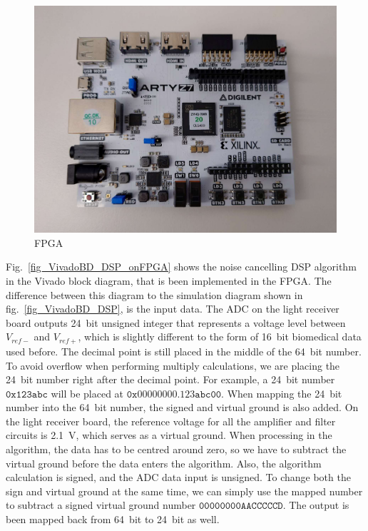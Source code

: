 \begin{figure}[h]
\centering
\includegraphics[width=1\linewidth]{4-ANC_Sys/FPGA.jpg}
\caption{FPGA}
\label{fig_FPGA}
\end{figure}

Fig.~\ref{fig_VivadoBD_DSP_onFPGA} shows the noise cancelling DSP algorithm in the Vivado block diagram, that is been implemented in the FPGA.  The difference between this diagram to the simulation diagram shown in fig.~\ref{fig_VivadoBD_DSP}, is the input data.  The ADC on the light receiver board outputs \qty{24}{bit} unsigned integer that represents a voltage level between $V_{ref-}$ and $V_{ref+}$, which is slightly different to the form of \qty{16}{bit} biomedical data used before.  The decimal point is still placed in the middle of the \qty{64}{bit} number.  To avoid overflow when performing multiply calculations, we are placing the \qty{24}{bit} number right after the decimal point.  For example, a \qty{24}{bit} number $\mathtt{0x123abc}$ will be placed at $\mathtt{0x00000000.123abc00}$.  When mapping the \qty{24}{bit} number into the \qty{64}{bit} number, the signed and virtual ground is also added.  On the light receiver board, the reference voltage for all the amplifier and filter circuits is \qty{2.1}{V}, which serves as a virtual ground.  When processing in the algorithm, the data has to be centred around zero, so we have to subtract the virtual ground before the data enters the algorithm.  Also, the algorithm calculation is signed, and the ADC data input is unsigned.  To change both the sign and virtual ground at the same time, we can simply use the mapped number to subtract a signed virtual ground number $\mathtt{00000000AACCCCCD}$.  The output is been mapped back from \qty{64}{bit} to \qty{24}{bit} as well.

